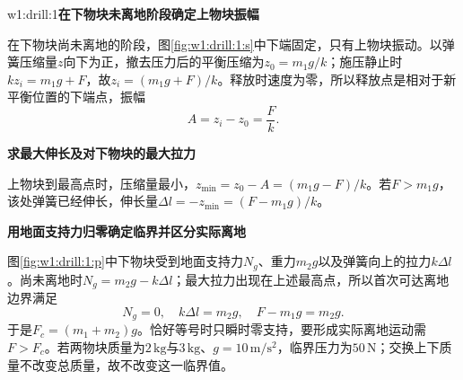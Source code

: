 \LectureAnswerSection

\begin{drillsolution}{w1:drill:1}\textbf{在下物块未离地阶段确定上物块振幅}\par\nobreak
在下物块尚未离地的阶段，图\ref{fig:w1:drill:1:s}中下端固定，只有上物块振动。以弹簧压缩量$z$向下为正，撤去压力后的平衡压缩为$z_0=m_1g/k$；施压静止时$kz_i=m_1g+F$，故$z_i=(m_1g+F)/k$。释放时速度为零，所以释放点是相对于新平衡位置的下端点，振幅
\[
A=z_i-z_0=\frac Fk.
\]


\par\medskip{}\noindent\textbf{求最大伸长及对下物块的最大拉力}\par\nobreak
上物块到最高点时，压缩量最小，$z_{\min}=z_0-A=(m_1g-F)/k$。若$F>m_1g$，该处弹簧已经伸长，伸长量$\Delta l=-z_{\min}=(F-m_1g)/k$。



\par\medskip{}\noindent\textbf{用地面支持力归零确定临界并区分实际离地}\par\nobreak
图\ref{fig:w1:drill:1:p}中下物块受到地面支持力$N_g$、重力$m_2g$以及弹簧向上的拉力$k\Delta l$。尚未离地时$N_g=m_2g-k\Delta l$；最大拉力出现在上述最高点，所以首次可达离地边界满足
\[
N_g=0,\quad k\Delta l=m_2g,\quad F-m_1g=m_2g.
\]
于是$F_c=(m_1+m_2)g$。恰好等号时只瞬时零支持，要形成实际离地运动需$F>F_c$。若两物块质量为$2\,\mathrm{kg}$与$3\,\mathrm{kg}$、$g=10\,\mathrm{m/s^2}$，临界压力为$50\,\mathrm N$；交换上下质量不改变总质量，故不改变这一临界值。\end{drillsolution}
